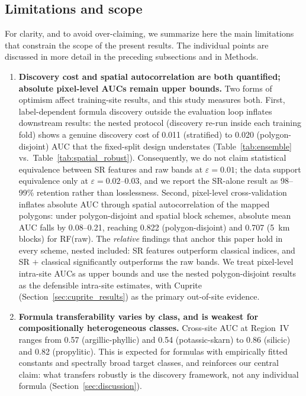 \documentclass[preprint,authoryear,number]{elsarticle}
\begin{document}
\subsection{Limitations and scope}
\label{sec:limitations}

For clarity, and to avoid over-claiming, we summarize here the main limitations that constrain the scope of the present results. The individual points are discussed in more detail in the preceding subsections and in Methods.

\begin{enumerate}
  \item \textbf{Discovery cost and spatial autocorrelation are both quantified; absolute pixel-level AUCs remain upper bounds.} Two forms of optimism affect training-site results, and this study measures both. First, label-dependent formula discovery outside the evaluation loop inflates downstream results: the nested protocol (discovery re-run inside each training fold) shows a genuine discovery cost of 0.011 (stratified) to 0.020 (polygon-disjoint) AUC that the fixed-split design understates (Table~\ref{tab:ensemble} vs.\ Table~\ref{tab:spatial_robust}). Consequently, we do not claim statistical equivalence between SR features and raw bands at $\varepsilon = 0.01$; the data support equivalence only at $\varepsilon = 0.02$--$0.03$, and we report the SR-alone result as 98--99\% retention rather than losslessness. Second, pixel-level cross-validation inflates absolute AUC through spatial autocorrelation of the mapped polygons: under polygon-disjoint and spatial block schemes, absolute mean AUC falls by 0.08--0.21, reaching 0.822 (polygon-disjoint) and 0.707 (\SI{5}{\kilo\meter} blocks) for RF(raw). The \emph{relative} findings that anchor this paper hold in every scheme, nested included: SR features outperform classical indices, and SR $+$ classical significantly outperforms the raw bands. We treat pixel-level intra-site AUCs as upper bounds and use the nested polygon-disjoint results as the defensible intra-site estimates, with Cuprite (Section~\ref{sec:cuprite_results}) as the primary out-of-site evidence.
  \item \textbf{Formula transferability varies by class, and is weakest for compositionally heterogeneous classes.} Cross-site AUC at Region~IV ranges from 0.57 (argillic-phyllic) and 0.54 (potassic-skarn) to 0.86 (silicic) and 0.82 (propylitic). This is expected for formulas with empirically fitted constants and spectrally broad target classes, and reinforces our central claim: what transfers robustly is the discovery framework, not any individual formula (Section~\ref{sec:discussion}).

\end{enumerate}
\end{document}
